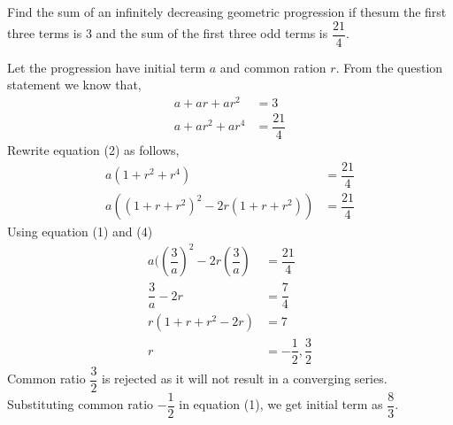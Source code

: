 

\question[4] Find the sum of an infinitely decreasing geometric progression if thesum the first three terms is $3$ and the sum of the first three odd terms is $\dfrac{21}{4}$.


\ifprintanswers
\fi 

\begin{solution}[\fullpage]
  Let the progression have initial term $a$ and common ration $r$. From the question statement we know that,
  \begin{align}
    a+ar+ar^2   &= 3 \\
    a+ar^2+ar^4 &= \dfrac{21}{4}
  \end{align}
  Rewrite equation (2) as follows,
  \begin{align}
    a(1+r^2+r^4)               &= \dfrac{21}{4} \\
	a((1+r+r^2)^2-2r(1+r+r^2)) &= \dfrac{21}{4}
  \end{align}
  Using equation (1) and (4)
  \begin{align}
    a((\dfrac{3}{a})^2-2r(\dfrac{3}{a}) &= \dfrac{21}{4} \\
    \dfrac{3}{a}-2r                     &= \dfrac{7}{4} \\
    r(1+r+r^2-2r)                       &= 7 \\
    r                                   &= -\dfrac{1}{2},\dfrac{3}{2}
  \end{align}
  Common ratio $\dfrac{3}{2}$ is rejected as it will not result in a converging series. Substituting common ratio $-\dfrac{1}{2}$ in equation (1), we get initial term as $\dfrac{8}{3}$.

\end{solution}
